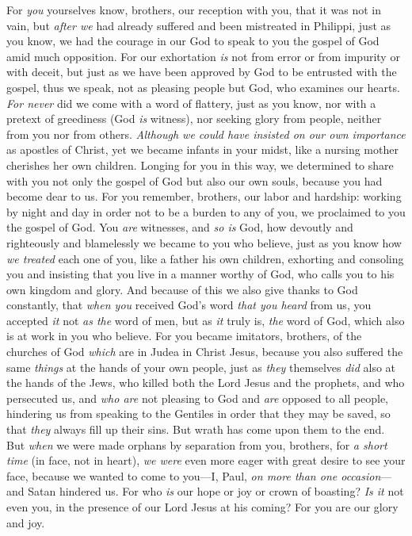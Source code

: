 \begin{biblechapter} %
 For \textit{you} yourselves know, brothers, our reception with you, that it was not in vain,
\verse but \textit{after we} had already suffered and been mistreated in Philippi, just as you know, we had the courage in our God to speak to you the gospel of God amid much opposition.
\verse For our exhortation \textit{is} not from error or from impurity or with deceit,
\verse but just as we have been approved by God to be entrusted with the gospel, thus we speak, not as pleasing people but God, who examines our hearts.
\verse \textit{For never} did we come with a word of flattery, just as you know, nor with a pretext of greediness (God \textit{is} witness),
\verse nor seeking glory from people, neither from you nor from others.
\verse \textit{Although we could have insisted on our own importance} as apostles of Christ, yet we became infants in your midst, like a nursing mother cherishes her own children.
\verse Longing for you in this way, we determined to share with you not only the gospel of God but also our own souls, because you had become dear to us.
\verse For you remember, brothers, our labor and hardship: working by night and day in order not to be a burden to any of you, we proclaimed to you the gospel of God.
\verse You \textit{are} witnesses, and \textit{so is} God, how devoutly and righteously and blamelessly we became to you who believe,
\verse just as you know how \textit{we treated} each one of you, like a father his own children,
\verse exhorting and consoling you and insisting that you live in a manner worthy of God, who calls you to his own kingdom and glory.
 And because of this we also give thanks to God constantly, that \textit{when you} received God’s word \textit{that you heard} from us, you accepted \textit{it} not \textit{as the} word of men, but as \textit{it} truly is, \textit{the} word of God, which also is at work in you who believe.
\verse For you became imitators, brothers, of the churches of God \textit{which} are in Judea in Christ Jesus, because you also suffered the same \textit{things} at the hands of your own people, just as \textit{they} themselves \textit{did} also at the hands of the Jews,
\verse who killed both the Lord Jesus and the prophets, and who persecuted us, and \textit{who are} not pleasing to God and \textit{are} opposed to all people,
\verse hindering us from speaking to the Gentiles in order that they may be saved, so that \textit{they} always fill up their sins. But wrath has come upon them to the end.
 But \textit{when} we were made orphans by separation from you, brothers, for \textit{a short time} (in face, not in heart), \textit{we were} even more eager with great desire to see your face,
\verse because we wanted to come to you—I, Paul, \textit{on more than one occasion}—and Satan hindered us.
\verse For who \textit{is} our hope or joy or crown of boasting? \textit{Is it} not even you, in the presence of our Lord Jesus at his coming?
\verse For you are our glory and joy.
\end{biblechapter}

